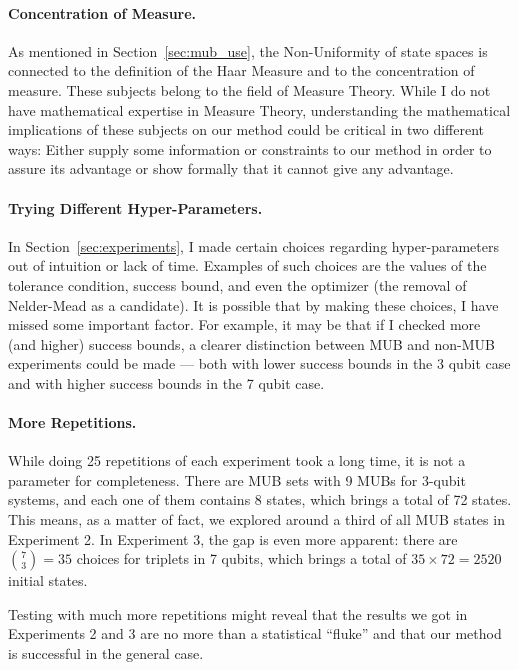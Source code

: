 \documentclass[a4paper,12pt]{article}
\begin{document}
\paragraph*{Concentration of Measure.}
As mentioned in Section~\ref{sec:mub_use}, the Non-Uniformity of state spaces is connected to the definition of the Haar Measure and to the concentration of measure.
These subjects belong to the field of Measure Theory.
While I do not have mathematical expertise in Measure Theory, understanding the mathematical implications of these subjects on our method could be critical in two different ways: Either supply some information or constraints to our method in order to assure its advantage or show formally that it cannot give any advantage.

\paragraph*{Trying Different Hyper-Parameters.}
In Section~\ref{sec:experiments}, I made certain choices regarding hyper-parameters out of intuition or lack of time.
Examples of such choices are the values of the tolerance condition, success bound, and even the optimizer (the removal of Nelder-Mead as a candidate).
It is possible that by making these choices, I have missed some important factor.
For example, it may be that if I checked more (and higher) success bounds, a clearer distinction between MUB and non-MUB experiments could be made --- both with lower success bounds in the 3 qubit case and with higher success bounds in the 7 qubit case.

\paragraph*{More Repetitions.}
While doing 25 repetitions of each experiment took a long time, it is not a parameter for completeness.
There are MUB sets with 9 MUBs for 3-qubit systems, and each one of them contains 8 states, which brings a total of 72 states.
This means, as a matter of fact, we explored around a third of all MUB states in Experiment 2.
In Experiment 3, the gap is even more apparent: there are ${7 \choose 3} = 35$ choices for triplets in 7 qubits, which brings a total of $35 \times 72 = 2520$ initial states.

Testing with much more repetitions might reveal that the results we got in Experiments 2 and 3 are no more than a statistical ``fluke'' and that our method is successful in the general case.
\end{document}
